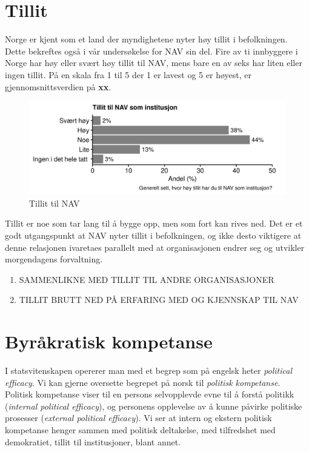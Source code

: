 \documentclass[
]{book}
\providecommand{\tightlist}{%
  \setlength{\itemsep}{0pt}\setlength{\parskip}{0pt}}
\begin{document}
\hypertarget{tillit}{%
\section{Tillit}\label{tillit}}

Norge er kjent som et land der myndighetene nyter høy tillit i befolkningen.
Dette bekreftes også i vår undersøkelse for NAV sin del.
Fire av ti innbyggere i Norge har høy eller svært høy tillit til NAV, mens bare en av seks har liten eller ingen tillit.
På en skala fra 1 til 5 der 1 er lavest og 5 er høyest, er gjennomsnittsverdien på \textbf{xx}.

\begin{figure}
\centering
\includegraphics{figs/png/fig_nav_trust.png}
\caption{Tillit til NAV}
\end{figure}

Tillit er noe som tar lang til å bygge opp, men som fort kan rives ned.
Det er et godt utgangspunkt at NAV nyter tillit i befolkningen, og ikke desto viktigere at denne relasjonen ivaretaes parallelt med at organisasjonen endrer seg og utvikler morgendagens forvaltning.

\begin{enumerate}
\def\labelenumi{\arabic{enumi}.}
\tightlist
\item
  SAMMENLIKNE MED TILLIT TIL ANDRE ORGANISASJONER
\item
  TILLIT BRUTT NED PÅ ERFARING MED OG KJENNSKAP TIL NAV
\end{enumerate}

\hypertarget{byruxe5kratisk-kompetanse}{%
\section{Byråkratisk kompetanse}\label{byruxe5kratisk-kompetanse}}

I statsvitenskapen opererer man med et begrep som på engelsk heter \emph{political efficacy}.
Vi kan gjerne oversette begrepet på norsk til \emph{politisk kompetanse}.
Politisk kompetanse viser til en persons selvopplevde evne til å forstå politikk (\emph{internal political efficacy}), og personens opplevelse av å kunne påvirke politiske prosesser (\emph{external political efficacy}).
Vi ser at intern og ekstern politisk kompetanse henger sammen med politisk deltakelse, med tilfredshet med demokratiet, tillit til institusjoner, blant annet.
\end{document}

